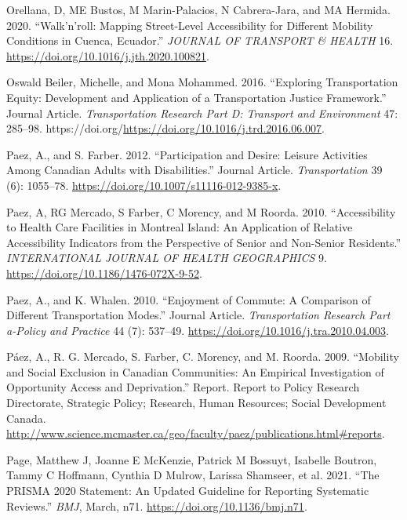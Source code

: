\documentclass[12pt, oneside]{report}
\newlength{\cslhangindent}
\newlength{\cslentryspacingunit} %
\newenvironment{CSLReferences}[2] %
 {%
  \setlength{\parindent}{0pt}
  \ifodd #1
  \let\oldpar\par
  \def\par{\hangindent=\cslhangindent\oldpar}
  \fi
  \setlength{\parskip}{#2\cslentryspacingunit}
 }%
 {}
\begin{document}
\begin{CSLReferences}{1}{0}
\leavevmode{}%
Orellana, D, ME Bustos, M Marin-Palacios, N Cabrera-Jara, and MA
Hermida. 2020. {``Walk'n'roll: {Mapping} Street-Level Accessibility for
Different Mobility Conditions in {Cuenca}, {Ecuador}.''} \emph{JOURNAL
OF TRANSPORT \& HEALTH} 16.
\url{https://doi.org/10.1016/j.jth.2020.100821}.

\leavevmode{}%
Oswald Beiler, Michelle, and Mona Mohammed. 2016. {``Exploring
Transportation Equity: Development and Application of a Transportation
Justice Framework.''} Journal Article. \emph{Transportation Research
Part D: Transport and Environment} 47: 285--98.
https://doi.org/\url{https://doi.org/10.1016/j.trd.2016.06.007}.

\leavevmode{}%
Paez, A., and S. Farber. 2012. {``Participation and Desire: Leisure
Activities Among Canadian Adults with Disabilities.''} Journal Article.
\emph{Transportation} 39 (6): 1055--78.
\url{https://doi.org/10.1007/s11116-012-9385-x}.

\leavevmode{}%
Paez, A, RG Mercado, S Farber, C Morency, and M Roorda. 2010.
{``Accessibility to Health Care Facilities in {Montreal Island}: An
Application of Relative Accessibility Indicators from the Perspective of
Senior and Non-Senior Residents.''} \emph{INTERNATIONAL JOURNAL OF
HEALTH GEOGRAPHICS} 9. \url{https://doi.org/10.1186/1476-072X-9-52}.

\leavevmode{}%
Paez, A., and K. Whalen. 2010. {``Enjoyment of Commute: A Comparison of
Different Transportation Modes.''} Journal Article. \emph{Transportation
Research Part a-Policy and Practice} 44 (7): 537--49.
\url{https://doi.org/10.1016/j.tra.2010.04.003}.

\leavevmode{}%
Páez, A., R. G. Mercado, S. Farber, C. Morency, and M. Roorda. 2009.
{``Mobility and Social Exclusion in Canadian Communities: An Empirical
Investigation of Opportunity Access and Deprivation.''} Report. Report
to Policy Research Directorate, Strategic Policy; Research, Human
Resources; Social Development Canada.
\url{http://www.science.mcmaster.ca/geo/faculty/paez/publications.html\#reports}.

\leavevmode{}%
Page, Matthew J, Joanne E McKenzie, Patrick M Bossuyt, Isabelle Boutron,
Tammy C Hoffmann, Cynthia D Mulrow, Larissa Shamseer, et al. 2021.
{``The {PRISMA} 2020 Statement: An Updated Guideline for Reporting
Systematic Reviews.''} \emph{BMJ}, March, n71.
\url{https://doi.org/10.1136/bmj.n71}.


\end{CSLReferences}
\end{document}
